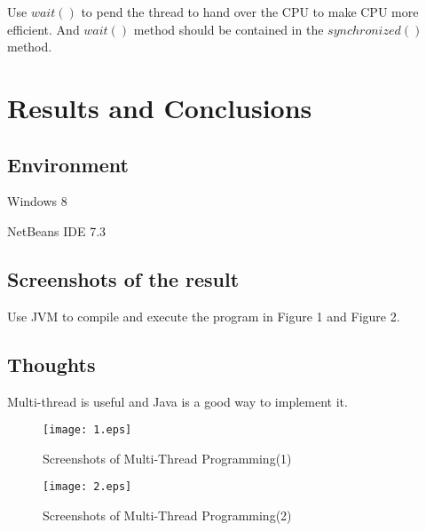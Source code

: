 \documentclass{article}
\begin{document}
Use $wait()$ to pend the thread to hand over the CPU to make CPU more efficient. And $wait()$ method should be contained in the $synchronized()$ method. 


\section{Results and Conclusions}
\subsection{Environment}
\begin{compactitem}
\item Windows 8
\item NetBeans IDE 7.3
\end{compactitem}
\subsection{Screenshots of the result}
Use JVM to compile and execute the program in Figure 1 and Figure 2.

\subsection{Thoughts}
Multi-thread is useful and Java is a good way to implement it.
\begin{figure}[h]
\centering
\texttt{[image: 1.eps]}
\caption{Screenshots of Multi-Thread Programming(1)}
\end{figure}
\begin{figure}[h]
\centering
\texttt{[image: 2.eps]}
\caption{Screenshots of Multi-Thread Programming(2)}
\end{figure}
\end{document}
